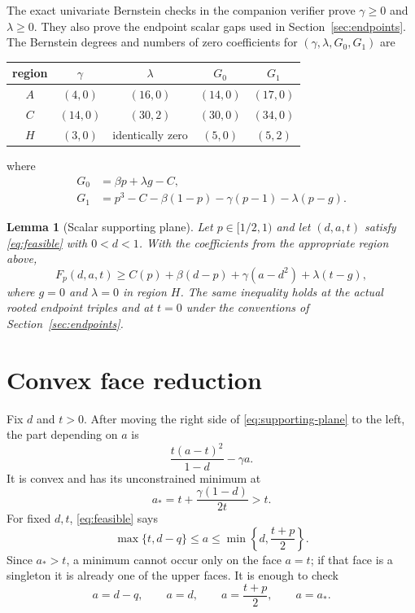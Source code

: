 \documentclass[11pt]{article}
\newtheorem{lemma}[theorem]{Lemma}
\begin{document}
The exact univariate Bernstein checks in the companion verifier prove
$\gamma\ge0$ and $\lambda\ge0$.  They also prove the endpoint scalar gaps
used in Section~\ref{sec:endpoints}.  The Bernstein degrees and numbers of
zero coefficients for $(\gamma,\lambda,G_0,G_1)$ are
\begin{center}
\begin{tabular}{c@{\qquad}cccc}
\toprule
region&$\gamma$&$\lambda$&$G_0$&$G_1$\\
\midrule
$A$&$(4,0)$&$(16,0)$&$(14,0)$&$(17,0)$\\
$C$&$(14,0)$&$(30,2)$&$(30,0)$&$(34,0)$\\
$H$&$(3,0)$&identically zero&$(5,0)$&$(5,2)$\\
\bottomrule
\end{tabular}
\end{center}
where
\begin{align*}
 G_0&=\beta p+\lambda g-C,\\
 G_1&=p^3-C-\beta(1-p)-\gamma(p-1)-\lambda(p-g).
\end{align*}

\begin{lemma}[Scalar supporting plane]
\label{lem:scalar}
Let $p\in[1/2,1)$ and let $(d,a,t)$ satisfy \eqref{eq:feasible} with
$0<d<1$.  With the coefficients from the appropriate region above,
\begin{equation}
 F_p(d,a,t)\ge
 C(p)+\beta(d-p)+\gamma(a-d^2)+\lambda(t-g),
 \label{eq:supporting-plane}
\end{equation}
where $g=0$ and $\lambda=0$ in region $H$.
The same inequality holds at the actual rooted endpoint triples and at
$t=0$ under the conventions of Section~\ref{sec:endpoints}.
\end{lemma}

\section{Convex face reduction}

Fix $d$ and $t>0$.  After moving the right side of
\eqref{eq:supporting-plane} to the left, the part depending on $a$ is
\[
 \frac{t(a-t)^2}{1-d}-\gamma a.
\]
It is convex and has its unconstrained minimum at
\begin{equation}
 a_*=t+\frac{\gamma(1-d)}{2t}>t.
 \label{eq:astar}
\end{equation}
For fixed $d,t$, \eqref{eq:feasible} says
\[
 \max\{t,d-q\}\le a\le\min\left\{d,\frac{t+p}{2}\right\}.
\]
Since $a_*>t$, a minimum cannot occur only on the face $a=t$; if that face
is a singleton it is already one of the upper faces.  It is enough to check
\begin{equation}
 a=d-q,\qquad a=d,\qquad a=\frac{t+p}{2},\qquad a=a_*.
 \label{eq:four-candidates}
\end{equation}
\end{document}
